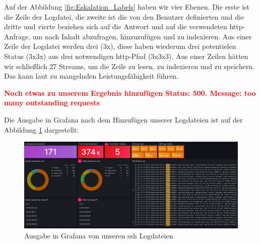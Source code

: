 Auf der Abbildung \ref{fig:Eskalation_Labels} haben wir vier Ebenen. Die erste ist die Zeile der Logdatei, die zweite ist die von den Benutzer definierten  und die dritte und vierte beziehen sich auf die Antwort und auf die verwendeten \gls{http}-Anfrage, um nach Inhalt abzufragen, hinzuzufügen und zu indexieren. Aus einer Zeile der Logdatei werden drei  (3x), diese haben wiederum drei potentielen Status (3x3x) aus drei notwendigen \gls{http}-Pfad (3x3x3). Aus einer Zeilen hätten wir schließlich 27 Streams, um die Zeile zu lesen, zu indexieren und zu speichern. Das kann laut \cite{Grafana_labels} zu mangelnden Leistungsfähigkeit führen.


\textcolor{red}{\textbf{Noch etwas zu unserem Ergebnis hinzufügen}}
\textcolor{red}{\textbf{Status: 500. Message: too many outstanding requests}}



\newpage
{} 
\thispagestyle{lscape}
\begin{landscape}
   Die Ausgabe in Grafana nach dem Hinzufügen unserer Logdateien ist auf der Abbildung \ref{fig:Unserssh} dargestellt:
    \begin{figure}[H]
        \centerline{\includegraphics[width=1.8\textwidth]{assets/unserssh}}
        \caption[Ausgabe in Grafana von unseren \gls{ssh} Logdateien]
        {Ausgabe in Grafana von unseren \gls{ssh} Logdateien}
        \label{fig:Unserssh}
        \centering
    \end{figure} 
\end{landscape}
\restoregeometry



 
